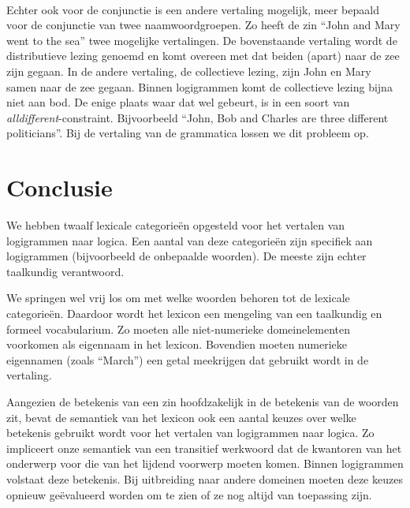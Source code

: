 \paragraph{} Echter ook voor de conjunctie is een andere vertaling mogelijk, meer bepaald voor de conjunctie van twee naamwoordgroepen. Zo heeft de zin ``John and Mary went to the sea'' twee mogelijke vertalingen. De bovenstaande vertaling wordt de distributieve lezing genoemd en komt overeen met dat beiden (apart) naar de zee zijn gegaan. In de andere vertaling, de collectieve lezing, zijn John en Mary samen naar de zee gegaan. Binnen logigrammen komt de collectieve lezing bijna niet aan bod. De enige plaats waar dat wel gebeurt, is in een soort van \textit{alldifferent}-constraint. Bijvoorbeeld ``John, Bob and Charles are three different politicians''. Bij de vertaling van de grammatica lossen we dit probleem op.

\section{Conclusie}
We hebben twaalf lexicale categorieën opgesteld voor het vertalen van logigrammen naar logica. Een aantal van deze categorieën zijn specifiek aan logigrammen (bijvoorbeeld de onbepaalde woorden). De meeste zijn echter taalkundig verantwoord.

We springen wel vrij los om met welke woorden behoren tot de lexicale categorieën. Daardoor wordt het lexicon een mengeling van een taalkundig en formeel vocabularium. Zo moeten alle niet-numerieke domeinelementen voorkomen als eigennaam in het lexicon. Bovendien moeten numerieke eigennamen (zoals ``March'') een getal meekrijgen dat gebruikt wordt in de vertaling.

Aangezien de betekenis van een zin hoofdzakelijk in de betekenis van de woorden zit, bevat de semantiek van het lexicon ook een aantal keuzes over welke betekenis gebruikt wordt voor het vertalen van logigrammen naar logica. Zo impliceert onze semantiek van een transitief werkwoord dat de kwantoren van het onderwerp voor die van het lijdend voorwerp moeten komen. Binnen logigrammen volstaat deze betekenis. Bij uitbreiding naar andere domeinen moeten deze keuzes opnieuw geëvalueerd worden om te zien of ze nog altijd van toepassing zijn.
